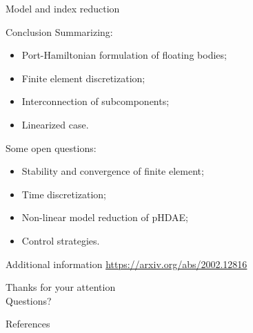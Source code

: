 \documentclass[aspectratio=169]{ISAE-Beamer}
\begin{document}
\begin{frame}{Model and index reduction}

\end{frame}

\begin{frame}{Conclusion}
Summarizing:
	\begin{itemize}
		\item Port-Hamiltonian formulation of floating bodies;
		\item Finite element discretization;
		\item Interconnection of subcomponents;
		\item Linearized case.
	\end{itemize}
Some open questions:
\begin{itemize}
	\item Stability and convergence of finite element;
	\item Time discretization;
	\item Non-linear model reduction of pHDAE;
	\item Control strategies.
\end{itemize}
\centering
\Large Additional information \url{https://arxiv.org/abs/2002.12816} \\
\end{frame}


\begin{frame}{}
\centering

\Huge Thanks for your attention \\
\Huge Questions?
\end{frame}

\begin{frame}[allowframebreaks]{References}
\printbibliography
\end{frame}
\end{document}

